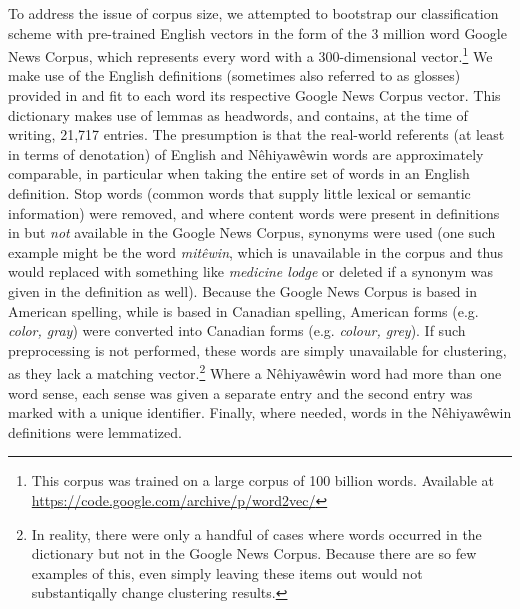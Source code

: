 To address the issue of corpus size, we attempted to bootstrap our classification scheme with pre-trained English vectors in the form of the 3 million word Google News Corpus, which represents every word with a 300-dimensional vector.\footnote{This corpus was trained on a large corpus of 100 billion words. Available at \url{https://code.google.com/archive/p/word2vec/}} We make use of the English definitions (sometimes also referred to as glosses) provided in \citet{Wolvengrey2001} and fit to each word its respective Google News Corpus vector. This dictionary makes use of lemmas as headwords, and contains, at the time of writing, 21,717 entries. The presumption is that the real-world referents (at least in terms of denotation) of English and Nêhiyawêwin words are approximately comparable, in particular when taking the entire set of words in an English definition. Stop words (common words that supply little lexical or semantic information) were removed, and where content words were present in definitions in \citet{Wolvengrey2001} but \emph{not} available in the Google News Corpus, synonyms were used (one such example might be the word \textit{mitêwin}, which is unavailable in the corpus and thus would replaced with something like \textit{medicine lodge} or deleted if a synonym was given in the definition as well). Because the Google News Corpus is based in American spelling, while \citet{Wolvengrey2001} is based in Canadian spelling, American forms (e.g. \textit{color, gray}) were converted into Canadian forms (e.g. \textit{colour, grey}). If such preprocessing is not performed, these words are simply unavailable for clustering, as they lack a matching vector.\footnote{In reality, there were only a handful of cases where words occurred in the dictionary but not in the Google News Corpus. Because there are so few examples of this, even simply leaving these items out would not substantiqally change clustering results.} Where a Nêhiyawêwin word had more than one word sense, each sense was given a separate entry and the second entry was marked with a unique identifier. Finally, where needed, words in the Nêhiyawêwin definitions were lemmatized.

